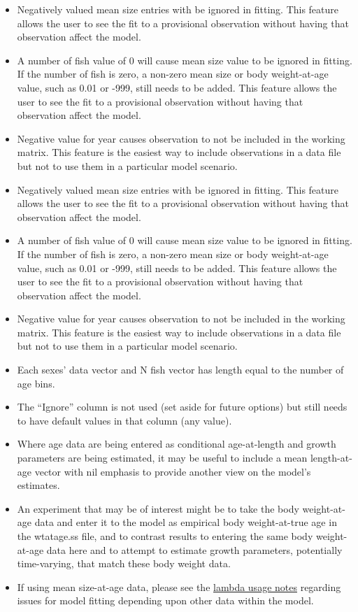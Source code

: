 	\begin{itemize}
		\item Negatively valued mean size entries with be ignored in fitting. This feature allows the user to see the fit to a provisional observation without having that observation affect the model.
		\item A number of fish value of 0 will cause mean size value to be ignored in fitting. If the number of fish is zero, a non-zero mean size or body weight-at-age value, such as 0.01 or -999, still needs to be added. This feature allows the user to see the fit to a provisional observation without having that observation affect the model.
		\item Negative value for year causes observation to not be included in the working matrix. This feature is the easiest way to include observations in a data file but not to use them in a particular model scenario.
		\item Negatively valued mean size entries with be ignored in fitting. This feature allows the user to see the fit to a provisional observation without having that observation affect the model.
		\item A number of fish value of 0 will cause mean size value to be ignored in fitting. If the number of fish is zero, a non-zero mean size or body weight-at-age value, such as 0.01 or -999, still needs to be added. This feature allows the user to see the fit to a provisional observation without having that observation affect the model.
		\item Negative value for year causes observation to not be included in the working matrix. This feature is the easiest way to include observations in a data file but not to use them in a particular model scenario.
		\item Each sexes' data vector and N fish vector has length equal to the number of age bins.
		\item The ``Ignore'' column is not used (set aside for future options) but still needs to have default values in that column (any value). 
		\item Where age data are being entered as conditional age-at-length and growth parameters are being estimated, it may be useful to include a mean length-at-age vector with nil emphasis to provide another view on the model's estimates.
		\item An experiment that may be of interest might be to take the body weight-at-age data and enter it to the model as empirical body weight-at-true age in the wtatage.ss file, and to contrast results to entering the same body weight-at-age data here and to attempt to estimate growth parameters, potentially time-varying, that match these body weight data.
		\item If using mean size-at-age data, please see the \hyperlink{SaAlambda}{lambda usage notes} regarding issues for model fitting depending upon other data within the model.  		
	\end{itemize}

